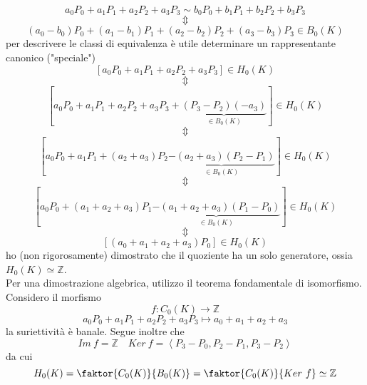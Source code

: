\documentclass[a4paper]{report}
\newcommand{\Z}{\ensuremath{\mathbb{Z}}}
\newcommand{\ra}{\ensuremath{\rightarrow}}
\newcommand{\gen}[1]{\ensuremath{\left<{#1}\right>}}
\begin{document}
\[
    a_0P_0+a_1P_1+a_2P_2+a_3P_3\sim b_0P_0+b_1P_1+b_2P_2+b_3P_3
\]
\[
    \Updownarrow
\]
\[
    (a_0-b_0)P_0+(a_1-b_1)P_1+(a_2-b_2)P_2+(a_3-b_3)P_3\in B_0(K)
\]
per descrivere le classi di equivalenza è utile determinare un rappresentante canonico ("speciale")
\[
    [a_0P_0+a_1P_1+a_2P_2+a_3P_3]\in H_0(K)
\]
\[
    \Updownarrow
\]
\[
    [a_0P_0+a_1P_1+a_2P_2+a_3P_3+\underbrace{(P_3-P_2)(-a_3)}_{\in B_0(K)}]\in H_0(K)
\]
\[
    \Updownarrow
\]
\[
    [a_0P_0+a_1P_1+(a_2+a_3)P_2\underbrace{-(a_2+a_3)(P_2-P_1)}_{\in B_0(K)}]\in H_0(K)
\]
\[
    \Updownarrow
\]
\[
    [a_0P_0+(a_1+a_2+a_3)P_1\underbrace{-(a_1+a_2+a_3)(P_1-P_0)}_{\in B_0(K)}]\in H_0(K)
\]
\[
    \Updownarrow
\]
\[
    [(a_0+a_1+a_2+a_3)P_0]\in H_0(K)
\]
ho (non rigorosamente) dimostrato che il quoziente ha un solo generatore, ossia $H_0(K)\simeq\Z$.\\
Per una dimostrazione algebrica, utilizzo il teorema fondamentale di isomorfismo. Considero il morfismo
\[
    f:C_0(K)\ra\Z
\]
\[
    a_0P_0+a_1P_1+a_2P_2+a_3P_3\longmapsto a_0+a_1+a_2+a_3
\]
la suriettività è banale. Segue inoltre che
\[
    Im\ f=\Z\quad Ker\ f=\gen{P_3-P_0,P_2-P_1,P_3-P_2}
\]
da cui
\[
    H_0(K)=\faktor{C_0(K)}{B_0(K)}=\faktor{C_0(K)}{Ker\ f}\simeq\Z
\]
\end{document}
